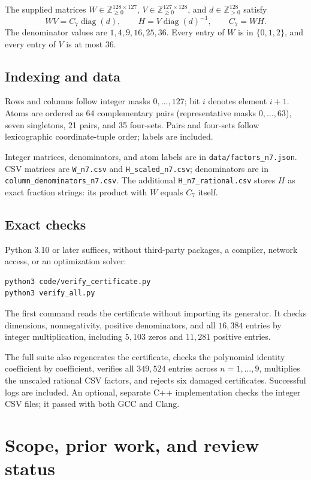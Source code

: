 \documentclass[11pt]{article}
\newcommand{\code}[1]{\texttt{\small #1}}
\begin{document}
The supplied matrices $W\in\mathbb Z_{\ge0}^{128\times127}$, $V\in\mathbb Z_{\ge0}^{127\times128}$, and $d\in\mathbb Z_{>0}^{128}$ satisfy
\[
WV=C_7\operatorname{diag}(d),\qquad
H=V\operatorname{diag}(d)^{-1},\qquad C_7=WH.
\]
The denominator values are $1,4,9,16,25,36$. Every entry of $W$ is in $\{0,1,2\}$, and every entry of $V$ is at most $36$.

\subsection*{Indexing and data}
Rows and columns follow integer masks $0,\ldots,127$; bit $i$ denotes element $i+1$. Atoms are ordered as 64 complementary pairs (representative masks $0,\ldots,63$), seven singletons, 21 pairs, and 35 four-sets. Pairs and four-sets follow lexicographic coordinate-tuple order; labels are included.

Integer matrices, denominators, and atom labels are in \code{data/factors\_n7.json}. CSV matrices are \code{W\_n7.csv} and \code{H\_scaled\_n7.csv}; denominators are in \code{column\_denominators\_n7.csv}. The additional \code{H\_n7\_rational.csv} stores $H$ as exact fraction strings: its product with $W$ equals $C_7$ itself.

\subsection*{Exact checks}
Python 3.10 or later suffices, without third-party packages, a compiler, network access, or an optimization solver:
\begin{lstlisting}
python3 code/verify_certificate.py
python3 verify_all.py
\end{lstlisting}
The first command reads the certificate without importing its generator. It checks dimensions, nonnegativity, positive denominators, and all $16{,}384$ entries by integer multiplication, including $5{,}103$ zeros and $11{,}281$ positive entries.

The full suite also regenerates the certificate, checks the polynomial identity coefficient by coefficient, verifies all $349{,}524$ entries across $n=1,\ldots,9$, multiplies the unscaled rational CSV factors, and rejects six damaged certificates. Successful logs are included. An optional, separate C++ implementation checks the integer CSV files; it passed with both GCC and Clang.

\section{Scope, prior work, and review status}
\end{document}
